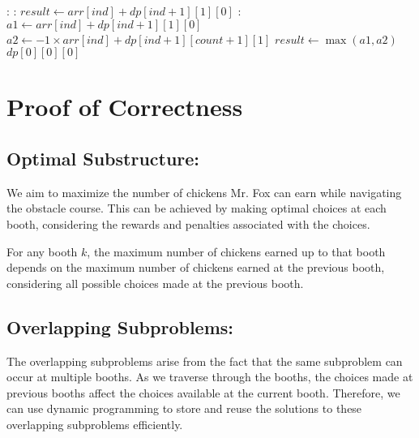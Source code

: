 \documentclass{article}
\begin{document}
\begin{algorithm}
\begin{algorithmic}[1]
                            \EndIf
                        :
                            :
                                \State $result \gets arr[ind] + dp[ind + 1][1][0]$
                            \Else:
                                \State $a1 \gets arr[ind] + dp[ind + 1][1][0]$
                                \State $a2 \gets -1 \times arr[ind] + dp[ind + 1][count + 1][1]$
                                \State $result \gets \max(a1, a2)$
                            \EndIf
                        \EndIf
                    \EndIf
                \EndFor
            \EndFor
        \EndFor
        \State \Return $dp[0][0][0]$
    \EndFunction
\end{algorithmic}
\end{algorithm}
    
\newpage


\section*{\huge Proof of Correctness}

\subsection*{\Large Optimal Substructure:}
We aim to maximize the number of chickens Mr. Fox can earn while navigating the obstacle course. This can be achieved by making optimal choices at each booth, considering the rewards and penalties associated with the choices.

For any booth $k$, the maximum number of chickens earned up to that booth depends on the maximum number of chickens earned at the previous booth, considering all possible choices made at the previous booth.

\subsection*{\Large Overlapping Subproblems:}
The overlapping subproblems arise from the fact that the same subproblem can occur at multiple booths. As we traverse through the booths, the choices made at previous booths affect the choices available at the current booth. Therefore, we can use dynamic programming to store and reuse the solutions to these overlapping subproblems efficiently.
\end{document}
